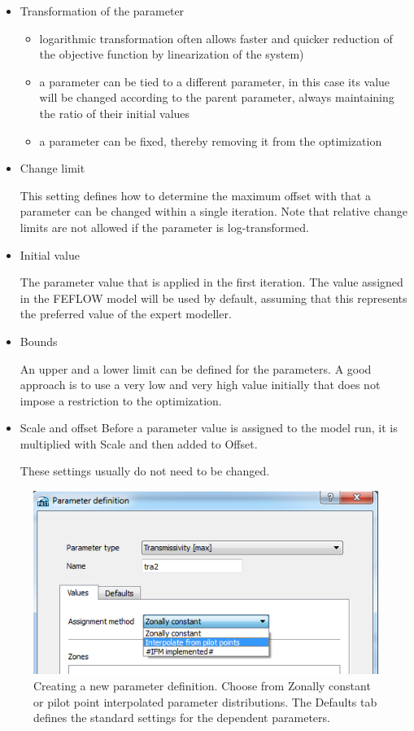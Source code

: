 \begin{itemize}
	\item Transformation of the parameter
	\begin{itemize}
	\item logarithmic transformation often allows faster and quicker reduction of the objective function by linearization of the system)
	\item a parameter can be tied to a different parameter, in this case its value will be changed according to the parent parameter, always maintaining the ratio of their initial values
	\item a parameter can be fixed, thereby removing it from the optimization
\end{itemize}

\item Change limit

This setting defines how to determine the maximum offset with that a parameter can be changed within a single iteration. Note that relative change limits are not allowed if the parameter is log-transformed.

\item Initial value

The parameter value that is applied in the first iteration. The value assigned in the FEFLOW model will be used by default, assuming that this represents the preferred value of the expert modeller.

\item Bounds

An upper and a lower limit can be defined for the parameters. A good approach is to use a very low and very high value initially that does not impose a restriction to the optimization.

\item Scale and offset
Before a parameter value is assigned to the model run, it is multiplied with Scale and then added to Offset.

These settings usually do not need to be changed.
\end{itemize}

\begin{figure}
	\center
	\includegraphics[width=\columnwidth]{figureFundamentalSetup/NewParameterDefinition.png}
\caption{Creating a new parameter definition. Choose from Zonally constant or pilot point interpolated parameter distributions. The Defaults tab defines the standard settings for the dependent parameters.}
\label{fig:fepest:NewParameterDefinition}
\end{figure}

